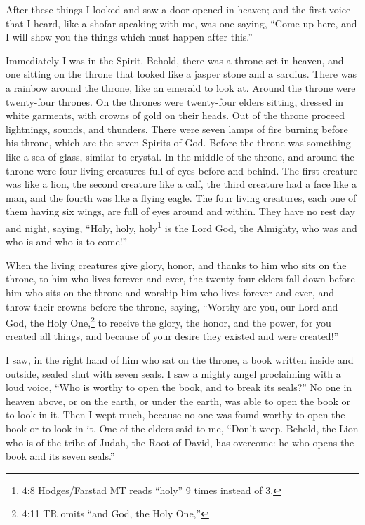 

\mychapter{} \myverse*{}After these things I looked and saw a door opened in heaven; and
the first voice that I heard, like a shofar speaking with me, was one saying, “Come up here, and I will
show you the things which must happen after this.”

\myverse{}Immediately I was in the Spirit. Behold, there was a throne set
in heaven, and one sitting on the throne
\myverse{}that looked like a jasper stone and a sardius. There was a rainbow around the
throne, like an emerald to look at.
\myverse{}Around the throne were twenty-four thrones. On the thrones were twenty-four
elders sitting, dressed in white garments, with crowns of gold on their heads.
\myverse{}Out of the throne proceed lightnings, sounds, and thunders. There were seven
lamps of fire burning before his throne, which are the seven Spirits of God.
\myverse{}Before the throne was something like a sea of glass, similar to crystal. In
the middle of the throne, and around the throne were four living creatures full of eyes before and behind.
\myverse{}The first creature was like a lion, the second creature like a calf, the third
creature had a face like a man, and the fourth was like a flying eagle.
\myverse{}The four living creatures, each one of them having six wings, are full of eyes
around and within. They have no rest day and night, saying, “Holy, holy, holy\footnote{4:8 Hodges/Farstad MT reads “holy” 9 times instead of 3.} is the Lord God, the Almighty,
who was and who is and who is to come!”

\myverse{}When the living creatures give glory, honor, and thanks to him
who sits on the throne, to him who lives forever and ever,
\myverse{}the twenty-four elders fall down before him who sits on the throne and worship
him who lives forever and ever, and throw their crowns before the throne, saying,
\myverse{}“Worthy are you, our Lord and God, the Holy One,\footnote{4:11 TR omits “and God, the Holy One,”} to receive the glory, the honor, and the power, for
you created all things, and because of your desire they existed and were created!”



\mychapter{} \myverse*{}I saw, in the right hand of him who sat on the throne, a book written
inside and outside, sealed shut with seven seals.
\myverse{}I saw a mighty angel proclaiming with a loud voice, “Who is worthy to open the
book, and to break its seals?”
\myverse{}No one in heaven above, or on the earth, or under the earth, was able to open
the book or to look in it.
\myverse{}Then I wept much, because no one was found worthy to open the book or to look
in it.
\myverse{}One of the elders said to me, “Don’t weep. Behold, the Lion who is of the tribe
of Judah, the Root of David, has overcome: he who opens the book and its seven seals.”

